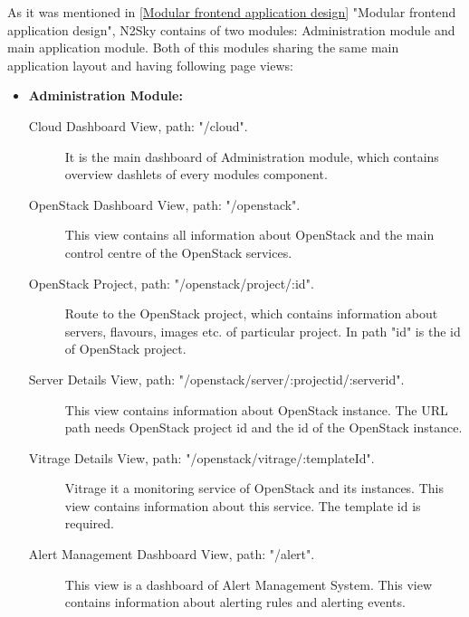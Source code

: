 As it was mentioned in \autoref{Modular frontend application design} "Modular frontend application design", N2Sky contains of two modules: Administration module and main application module. Both of this modules sharing the same main application layout and having following page views: 
\begin{itemize}
\item \textbf{Administration Module:}
\begin{description}
\item[Cloud Dashboard View, path: "/cloud".] It is the main dashboard of Administration module, which contains overview dashlets of every modules component.
\item[OpenStack Dashboard View, path: "/openstack".] This view contains all information about OpenStack and the main control centre of the OpenStack services.
\item[OpenStack Project, path: "/openstack/project/:id".] Route to the OpenStack project, which contains information about servers, flavours, images etc. of particular project. In path "id" is the id of OpenStack project.
\item[Server Details View, path: "/openstack/server/:projectid/:serverid".] This view contains information about OpenStack instance. The URL path needs OpenStack project id and the id of the OpenStack instance. 
\item[Vitrage Details View, path: "/openstack/vitrage/:templateId".] Vitrage it a monitoring service of OpenStack and its instances. This view contains information about this service. The template id is required.
\item[Alert Management Dashboard View, path: "/alert".]  This view is a dashboard of Alert Management System. This view contains information about alerting rules and alerting events.
\end{description}


\end{itemize}
